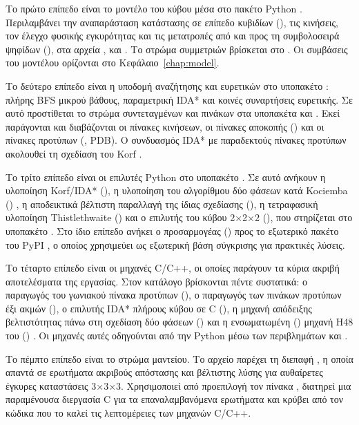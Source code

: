 Το πρώτο επίπεδο είναι το μοντέλο του κύβου μέσα στο πακέτο Python . Περιλαμβάνει την αναπαράσταση κατάστασης σε επίπεδο κυβιδίων (), τις κινήσεις, τον έλεγχο φυσικής εγκυρότητας και τις μετατροπές από και προς τη συμβολοσειρά ψηφίδων (), στα αρχεία ,  και . Το στρώμα συμμετριών βρίσκεται στο . Οι συμβάσεις του μοντέλου ορίζονται στο Κεφάλαιο~\ref{chap:model}.

Το δεύτερο επίπεδο είναι η υποδομή αναζήτησης και ευρετικών στο υποπακέτο : πλήρης BFS μικρού βάθους, παραμετρική IDA* και κοινές συναρτήσεις ευρετικής. Σε αυτό προστίθεται το στρώμα συντεταγμένων και πινάκων στα υποπακέτα  και . Εκεί παράγονται και διαβάζονται οι πίνακες κινήσεων, οι πίνακες αποκοπής () και οι πίνακες προτύπων (, PDB). Ο συνδυασμός IDA* με παραδεκτούς πίνακες προτύπων ακολουθεί τη σχεδίαση του Korf \cite{korf1997pattern}.

Το τρίτο επίπεδο είναι οι επιλυτές Python στο υποπακέτο . Σε αυτό ανήκουν η υλοποίηση Korf/IDA* (), η υλοποίηση του αλγορίθμου δύο φάσεων κατά Kociemba () \cite{kociembaTwoPhase}, η αποδεικτικά βέλτιστη παραλλαγή της ίδιας σχεδίασης (), η τετραφασική υλοποίηση Thistlethwaite () και ο επιλυτής του κύβου 2×2×2 (), που στηρίζεται στο υποπακέτο . Στο ίδιο επίπεδο ανήκει ο προσαρμογέας () προς το εξωτερικό πακέτο  του PyPI \cite{muodovKociembaPkg}, ο οποίος χρησιμεύει ως εξωτερική βάση σύγκρισης για πρακτικές λύσεις.

Το τέταρτο επίπεδο είναι οι μηχανές C/C++, οι οποίες παράγουν τα κύρια ακριβή αποτελέσματα της εργασίας. Στον κατάλογο  βρίσκονται πέντε συστατικά: ο παραγωγός του γωνιακού πίνακα προτύπων (), ο παραγωγός των πινάκων προτύπων έξι ακμών (), ο επιλυτής IDA* πλήρους κύβου σε C (), η μηχανή απόδειξης βελτιστότητας πάνω στη σχεδίαση δύο φάσεων () και η ενσωματωμένη () μηχανή H48 του  () \cite{trontoNissyCoreH48}. Οι μηχανές αυτές οδηγούνται από την Python μέσω των περιβλημάτων  και .

Το πέμπτο επίπεδο είναι το στρώμα μαντείου. Το αρχείο  παρέχει τη διεπαφή , η οποία απαντά σε ερωτήματα ακριβούς απόστασης και βέλτιστης λύσης για αυθαίρετες έγκυρες καταστάσεις 3×3×3. Χρησιμοποιεί από προεπιλογή τον πίνακα , διατηρεί μια παραμένουσα διεργασία C για τα επαναλαμβανόμενα ερωτήματα και κρύβει από τον κώδικα που το καλεί τις λεπτομέρειες των μηχανών C/C++.

